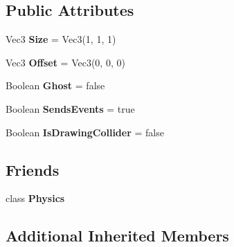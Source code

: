 \subsection*{Public Attributes}
\begin{DoxyCompactItemize}
\item 
\hypertarget{classDCEngine_1_1Components_1_1BoxCollider_a9de2348be8a6bcd6f61a2e711ecdd0eb}{Vec3 {\bfseries Size} = Vec3(1, 1, 1)}\label{classDCEngine_1_1Components_1_1BoxCollider_a9de2348be8a6bcd6f61a2e711ecdd0eb}

\item 
\hypertarget{classDCEngine_1_1Components_1_1BoxCollider_a8d97e25a0480b3c348dd573f81780bfc}{Vec3 {\bfseries Offset} = Vec3(0, 0, 0)}\label{classDCEngine_1_1Components_1_1BoxCollider_a8d97e25a0480b3c348dd573f81780bfc}

\item 
\hypertarget{classDCEngine_1_1Components_1_1BoxCollider_ab91d66d55512be9e6e3ae67ebe32a85b}{Boolean {\bfseries Ghost} = false}\label{classDCEngine_1_1Components_1_1BoxCollider_ab91d66d55512be9e6e3ae67ebe32a85b}

\item 
\hypertarget{classDCEngine_1_1Components_1_1BoxCollider_a45cda38d0f526fd15f44ef7b7b9ef0f1}{Boolean {\bfseries Sends\-Events} = true}\label{classDCEngine_1_1Components_1_1BoxCollider_a45cda38d0f526fd15f44ef7b7b9ef0f1}

\item 
\hypertarget{classDCEngine_1_1Components_1_1BoxCollider_a4a3c69f9d52283cd3589525af61bef4f}{Boolean {\bfseries Is\-Drawing\-Collider} = false}\label{classDCEngine_1_1Components_1_1BoxCollider_a4a3c69f9d52283cd3589525af61bef4f}

\end{DoxyCompactItemize}
\subsection*{Friends}
\begin{DoxyCompactItemize}
\item 
\hypertarget{classDCEngine_1_1Components_1_1BoxCollider_a2bfcbae6c8e1d7af93c5ac1200b1535c}{class {\bfseries Physics}}\label{classDCEngine_1_1Components_1_1BoxCollider_a2bfcbae6c8e1d7af93c5ac1200b1535c}

\end{DoxyCompactItemize}
\subsection*{Additional Inherited Members}


